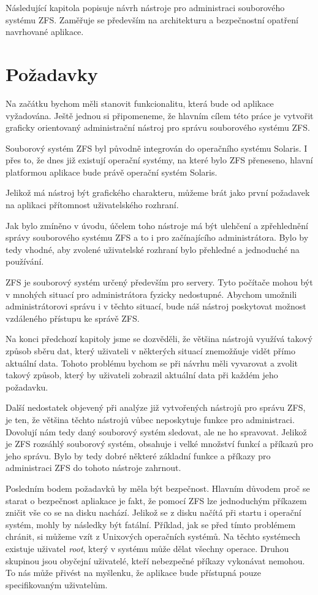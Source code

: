 Následující kapitola popisuje návrh nástroje pro administraci souborového systému ZFS. Zaměřuje se především na architekturu a bezpečnostní opatření navrhované aplikace.
\section{Požadavky}
Na začátku bychom měli stanovit funkcionalitu, která bude od aplikace vyžadována. Ještě jednou si připomeneme, že hlavním cílem této práce je vytvořit graficky orientovaný administrační nástroj pro správu souborového systému ZFS.

Souborový systém ZFS byl původně integrován do operačního systému Solaris. I přes to, že dnes již existují operační systémy, na které bylo ZFS přeneseno, hlavní platformou aplikace bude právě operační systém Solaris.

Jelikož má nástroj být grafického charakteru, můžeme brát jako první požadavek na aplikaci přítomnost uživatelského rozhraní.

Jak bylo zmíněno v úvodu, účelem toho nástroje má být ulehčení a zpřehlednění správy souborového systému ZFS a to i pro začínajícího administrátora. Bylo by tedy vhodné, aby zvolené uživatelské rozhraní bylo přehledné a jednoduché na používání.

ZFS je souborový systém určený především pro servery. Tyto počítače mohou být v mnohých situací pro administrátora fyzicky nedostupné. Abychom umožnili administrátorovi správu i v těchto situací, bude náš nástroj poskytovat možnost vzdáleného přístupu ke správě ZFS.

Na konci předchozí kapitoly jsme se dozvěděli, že většina nástrojů využívá takový způsob sběru dat, který uživateli v některých situací znemožňuje vidět přímo aktuální data. Tohoto problému bychom se při návrhu měli vyvarovat a zvolit takový způsob, který by uživateli zobrazil aktuální data při každém jeho požadavku.

Další nedostatek objevený při analýze již vytvořených nástrojů pro správu ZFS, je ten, že většina těchto nástrojů vůbec neposkytuje funkce pro administraci. Dovolují nám tedy daný souborový systém sledovat, ale ne ho spravovat. Jelikož je ZFS rozsáhlý souborový systém, obsahuje i velké množství funkcí a příkazů pro jeho správu. Bylo by tedy dobré některé základní funkce a příkazy pro administraci ZFS do tohoto nástroje zahrnout.

Posledním bodem požadavků by měla být bezpečnost. Hlavním důvodem proč se starat o bezpečnost apliakace je fakt, že pomocí ZFS lze jednoduchým příkazem zničit vše co se na disku nachází. Jelikož se z disku načítá při startu i operační systém, mohly by následky být fatální. Příklad, jak se před tímto problémem chránit, si můžeme vzít z Unixových operačních systémů. Na těchto systémech existuje uživatel \emph{root}, který v systému může dělat všechny operace. Druhou skupinou jsou obyčejní uživatelé, kteří nebezpečné příkazy vykonávat nemohou. To nás může přivést na myšlenku, že aplikace bude přístupná pouze specifikovaným uživatelům.

